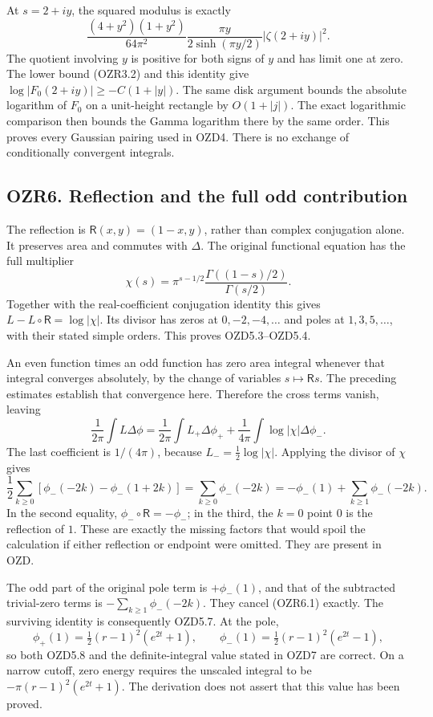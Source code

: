 At \(s=2+iy\), the squared modulus is exactly \[
\frac{(4+y^2)(1+y^2)}{64\pi^2}
\frac{\pi y}{2\sinh(\pi y/2)}|\zeta(2+iy)|^2.
\] The quotient involving \(y\) is positive for both signs of \(y\) and
has limit one at zero. The lower bound (OZR3.2) and this identity give
\(\log|F_0(2+iy)|\ge-C(1+|y|)\). The same disk argument bounds the
absolute logarithm of \(F_0\) on a unit-height rectangle by
\(O(1+|j|)\). The exact logarithmic comparison then bounds the Gamma
logarithm there by the same order. This proves every Gaussian pairing
used in OZD4. There is no exchange of conditionally convergent
integrals.

\subsection{OZR6. Reflection and the full odd
contribution}\label{ozr6.-reflection-and-the-full-odd-contribution}

The reflection is \(\mathsf R(x,y)=(1-x,y)\), rather than complex
conjugation alone. It preserves area and commutes with \(\Delta\). The
original functional equation has the full multiplier \[
\chi(s)=\pi^{s-1/2}\frac{\Gamma((1-s)/2)}{\Gamma(s/2)}.
\] Together with the real-coefficient conjugation identity this gives
\(L-L\circ\mathsf R=\log|\chi|\). Its divisor has zeros at
\(0,-2,-4,\ldots\) and poles at \(1,3,5,\ldots\), with their stated
simple orders. This proves OZD5.3--OZD5.4.

An even function times an odd function has zero area integral whenever
that integral converges absolutely, by the change of variables
\(s\mapsto\mathsf R s\). The preceding estimates establish that
convergence here. Therefore the cross terms vanish, leaving \[
\frac1{2\pi}\int L\Delta\phi
=\frac1{2\pi}\int L_+\Delta\phi_+
+\frac1{4\pi}\int\log|\chi|\Delta\phi_-.
\] The last coefficient is \(1/(4\pi)\), because
\(L_-=\tfrac12\log|\chi|\). Applying the divisor of \(\chi\) gives \[
\frac12\sum_{k\ge0}[\phi_-(-2k)-\phi_-(1+2k)]
=\sum_{k\ge0}\phi_-(-2k)
=-\phi_-(1)+\sum_{k\ge1}\phi_-(-2k).
\tag{OZR6.1}
\] In the second equality, \(\phi_-\circ\mathsf R=-\phi_-\); in the
third, the \(k=0\) point \(0\) is the reflection of \(1\). These are
exactly the missing factors that would spoil the calculation if either
reflection or endpoint were omitted. They are present in OZD.

The odd part of the original pole term is \(+\phi_-(1)\), and that of
the subtracted trivial-zero terms is \(-\sum_{k\ge1}\phi_-(-2k)\). They
cancel (OZR6.1) exactly. The surviving identity is consequently OZD5.7.
At the pole, \[
\phi_+(1)=\tfrac12(r-1)^2(e^{2t}+1),\qquad
\phi_-(1)=\tfrac12(r-1)^2(e^{2t}-1),
\] so both OZD5.8 and the definite-integral value stated in OZD7 are
correct. On a narrow cutoff, zero energy requires the unscaled integral
to be \(-\pi(r-1)^2(e^{2t}+1)\). The derivation does not assert that
this value has been proved.

